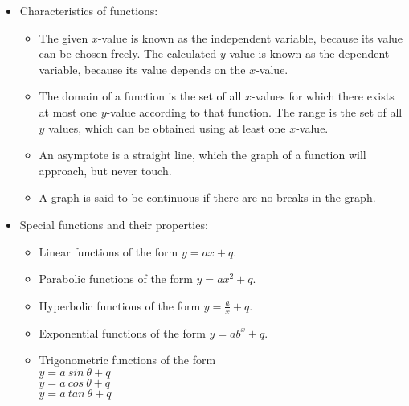 
\begin{itemize}[noitemsep]
\item Characteristics of functions: 
\begin{itemize}[noitemsep]
\item The given $x$-value is known as the independent variable, because its value can be chosen freely. The calculated $y$-value is known as the dependent variable, because its value depends on the  $x$-value.
\item The domain of a function is the set of all $x$-values for which there exists at most one $y$-value according to that function. The range is the set of all $y$ values, which can be obtained using at least one $x$-value.
\item An asymptote is a straight  line, which the graph of a function will approach, but never touch.
\item A graph is said to be continuous if there are no breaks in the graph. 
\end{itemize}

\item Special functions and their properties:
  \begin{itemize}[noitemsep]
  \item Linear functions of the form $y=ax+q$.
  \item Parabolic functions of the form $y=a{x}^{2}+q$. 
  \item Hyperbolic functions of the form $y=\frac{a}{x}+q$. 
  \item Exponential functions of the form $y=a{b}^{x}+q$. 
  \item Trigonometric functions of the form \\$y=a~sin~\theta+q$ \\$y=a~cos ~\theta+q$\\ $y=a~tan ~\theta+q$ 
  \end{itemize}
\end{itemize}

